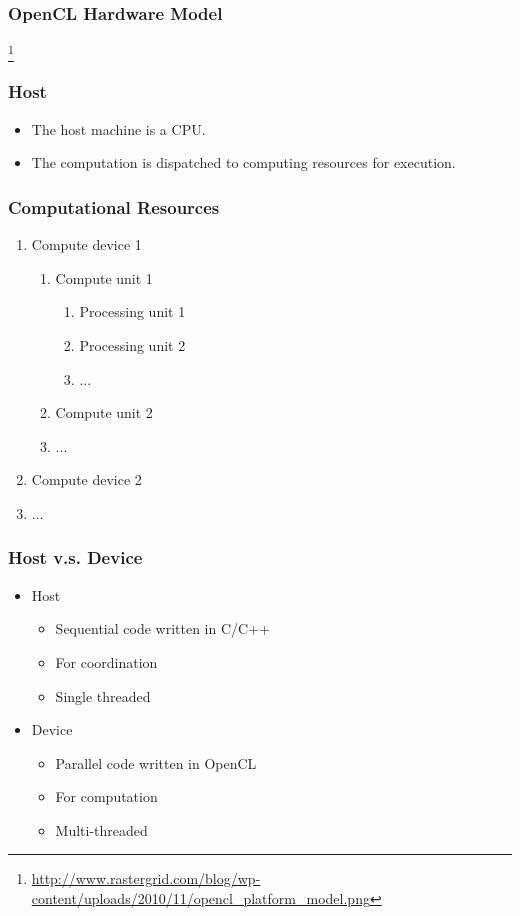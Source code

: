 \documentclass{beamer}
\begin{document}
\begin{frame}
  \frametitle{OpenCL Hardware Model}
  \centerline{}\footnote{\url{http://www.rastergrid.com/blog/wp-content/uploads/2010/11/opencl_platform_model.png}}
\end{frame}

\begin{frame}
  \frametitle{Host}
  \begin{itemize}
  \item The host machine is a CPU.
  \item The computation is dispatched to computing resources for
    execution.
  \end{itemize}
\end{frame}

\begin{frame}
  \frametitle{Computational Resources}
  \begin{enumerate}
  \item Compute device 1
    \begin{enumerate}
    \item Compute unit 1
      \begin{enumerate}
      \item Processing unit 1
      \item Processing unit 2
      \item ...
      \end{enumerate}
    \item Compute unit 2
    \item ...
    \end{enumerate}
  \item Compute device 2
  \item ...
  \end{enumerate}
\end{frame}

\begin{frame}
  \frametitle{Host v.s. Device}
  \begin{itemize}
  \item Host
    \begin{itemize}
    \item Sequential code written in C/C++
    \item For coordination
    \item Single threaded
    \end{itemize}
  \item Device
    \begin{itemize}
    \item Parallel code written in OpenCL 
    \item For computation
    \item Multi-threaded
    \end{itemize}
  \end{itemize}
\end{frame}
\end{document}
